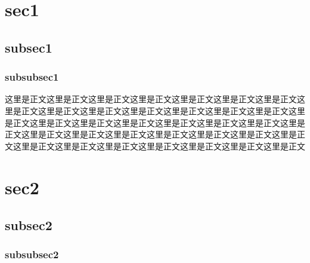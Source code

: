 \documentclass{my_class}
\begin{document}

% 


    




\section{sec1}
\subsection{subsec1}
\subsubsection{subsubsec1}
这里是正文这里是正文这里是正文这里是正文这里是正文这里是正文这里是正文这里是正文这里是正文这里是正文这里是正文这里是正文这里是正文这里是正文这里是正文这里是正文这里是正文这里是正文这里是正文这里是正文这里是正文这里是正文这里是正文这里是正文这里是正文这里是正文这里是正文这里是正文这里是正文这里是正文这里是正文这里是正文这里是正文这里是正文这里是正文这里是正文

\section{sec2}
\subsection{subsec2}
\subsubsection{subsubsec2}
\end{document}
